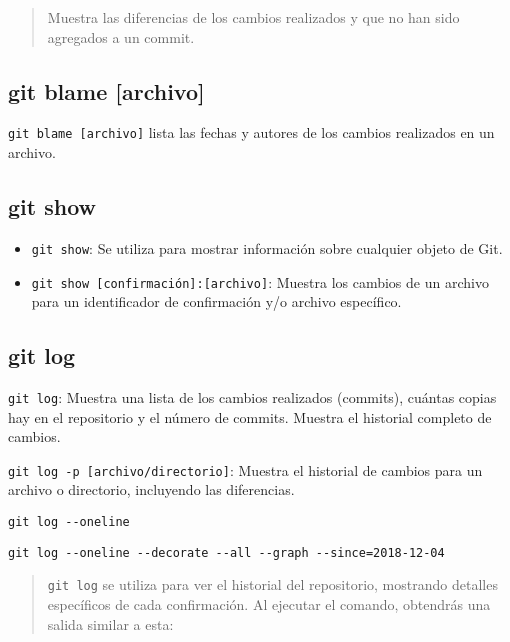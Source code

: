\documentclass[
  letterpaper,
  DIV=11,
  numbers=noendperiod]{scrartcl}
\begin{document}
\begin{quote}
Muestra las diferencias de los cambios realizados y que no han sido
agregados a un commit.
\end{quote}

\hypertarget{git-blame-archivo}{%
\subsection{git blame {[}archivo{]}}\label{git-blame-archivo}}

\texttt{git\ blame\ {[}archivo{]}} lista las fechas y autores de los
cambios realizados en un archivo.

\hypertarget{git-show}{%
\subsection{git show}\label{git-show}}

\begin{itemize}
\item
  \texttt{git\ show}: Se utiliza para mostrar información sobre
  cualquier objeto de Git.
\item
  \texttt{git\ show\ {[}confirmación{]}:{[}archivo{]}}: Muestra los
  cambios de un archivo para un identificador de confirmación y/o
  archivo específico.
\end{itemize}

\hypertarget{git-log}{%
\subsection{git log}\label{git-log}}

\texttt{git\ log}: Muestra una lista de los cambios realizados
(commits), cuántas copias hay en el repositorio y el número de commits.
Muestra el historial completo de cambios.

\texttt{git\ log\ -p\ {[}archivo/directorio{]}}: Muestra el historial de
cambios para un archivo o directorio, incluyendo las diferencias.

\texttt{git\ log\ -\/-oneline}

\texttt{git\ log\ -\/-oneline\ -\/-decorate\ -\/-all\ -\/-graph\ -\/-since=2018-12-04}

\begin{quote}
\texttt{git\ log} se utiliza para ver el historial del repositorio,
mostrando detalles específicos de cada confirmación. Al ejecutar el
comando, obtendrás una salida similar a esta:
\end{quote}
\end{document}

